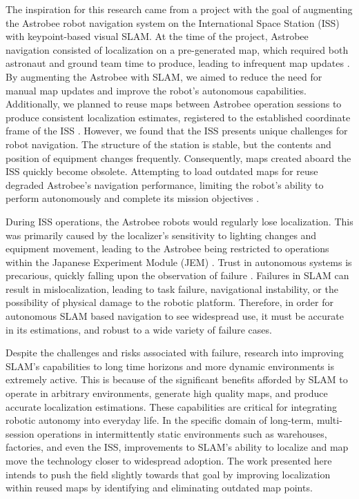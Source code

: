 The inspiration for this research came from a project with the goal of augmenting the Astrobee robot navigation system on the International Space Station (ISS) with keypoint-based visual SLAM. At the time of the project, Astrobee navigation consisted of localization on a pre-generated map, which required both astronaut and ground team time to produce, leading to infrequent map updates \cite{soussanAstroLocEfficientRobust2022}. By augmenting the Astrobee with SLAM, we aimed to reduce the need for manual map updates and improve the robot's autonomous capabilities. Additionally, we planned to reuse maps between Astrobee operation sessions to produce consistent localization estimates, registered to the established coordinate frame of the ISS \cite{zuralesCollaborativeSensingMapping2024}. However, we found that the ISS presents unique challenges for robot navigation. The structure of the station is stable, but the contents and position of equipment changes frequently. Consequently, maps created aboard the ISS quickly become obsolete. Attempting to load outdated maps for reuse degraded Astrobee's navigation performance, limiting the robot's ability to perform autonomously and complete its mission objectives \cite{carlinoLessonsLearnedAstrobee}.


During ISS operations, the Astrobee robots would regularly lose localization. This was primarily caused by the localizer's sensitivity to lighting changes and equipment movement, leading to the Astrobee being restricted to operations within the Japanese Experiment Module (JEM) \cite{carlinoLessonsLearnedAstrobee}. Trust in autonomous systems is precarious, quickly falling upon the observation of failure \cite{robinetteEffectRobotPerformance2017}. Failures in SLAM can result in mislocalization, leading to task failure, navigational instability, or the possibility of physical damage to the robotic platform\cite{nahavandiComprehensiveReviewAutonomous2025a}. Therefore, in order for autonomous SLAM based navigation to see widespread use, it must be accurate in its estimations, and robust to a wide variety of failure cases.


Despite the challenges and risks associated with failure, research into improving SLAM's capabilities to long time horizons and more dynamic environments is extremely active. This is because of the significant benefits afforded by SLAM to operate in arbitrary environments, generate high quality maps, and produce accurate localization estimations. These capabilities are critical for integrating robotic autonomy into everyday life. In the specific domain of long-term, multi-session operations in intermittently static environments such as warehouses, factories, and even the ISS, improvements to SLAM's ability to localize and map move the technology closer to widespread adoption.  The work presented here intends to push the field slightly towards that goal by improving localization within reused maps by identifying and eliminating outdated map points.
